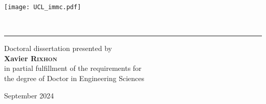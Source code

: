 \begin{titlingpage}

\begin{flushleft}
\texttt{[image: UCL\_immc.pdf]}
\end{flushleft}


\vspace{2 cm}


\begin{flushright}
\vspace{0.2cm}
{\fontsize{16}{20}\selectfont \mytitle\\[1em]
{\fontsize{14}{16}\selectfont \mysubtitle}}
\end{flushright}

\begin{flushright}
\rule{0.75\linewidth}{0.2mm}
\end{flushright}

\begin{flushright}
\vspace{1 cm}
\begin{small}
Doctoral dissertation presented by\\
\vspace{0.1cm}
{\Large \textbf{Xavier \textsc{Rixhon}}}\\
\vspace{0.1cm}
in partial fulfillment of the requirements for\\
the degree of Doctor in Engineering Sciences\\[1em]%
\end{small}
\end{flushright}

\begin{flushright}
\begin{small}
September 2024\\%
\end{small}
\end{flushright}



\end{titlingpage}
